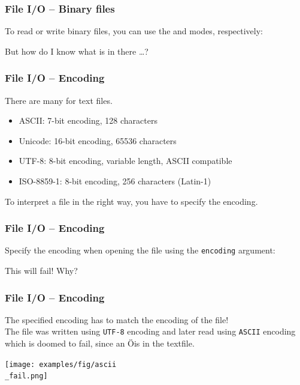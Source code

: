 \documentclass{beamer}
\begin{document}
\begin{frame}
  \frametitle{File I/O -- Binary files}
  To read or write binary files, you can use the \texttt{} and \texttt{} modes, respectively:
  
  But how do I know what is in there \dots ?
\end{frame}
\begin{frame}
  \frametitle{File I/O -- Encoding}
  There are many  for text files.\\
  \begin{itemize}
    \item ASCII: 7-bit encoding, 128 characters
    \item Unicode: 16-bit encoding, 65536 characters
    \item UTF-8: 8-bit encoding, variable length, ASCII compatible
    \item ISO-8859-1: 8-bit encoding, 256 characters (Latin-1)
  \end{itemize}
  To interpret a file in the right way, you have to specify the encoding.\\
\end{frame}
\begin{frame}
  \frametitle{File I/O -- Encoding}
  Specify the encoding when opening the file using the \texttt{encoding} argument:
  
  This will fail! Why? 
\end{frame}
\begin{frame}
  \frametitle{File I/O -- Encoding}
  The specified encoding has to match the encoding of the file!\\
  \vspace{5mm}
  The file was written using \texttt{UTF-8} encoding and later read using \texttt{ASCII} encoding which is doomed to fail, since an \glq Ö\grq is in the textfile.\\
  \begin{center}
    \texttt{[image: examples/fig/ascii\\\_fail.png]}
  \end{center}
\end{frame}
\end{document}
